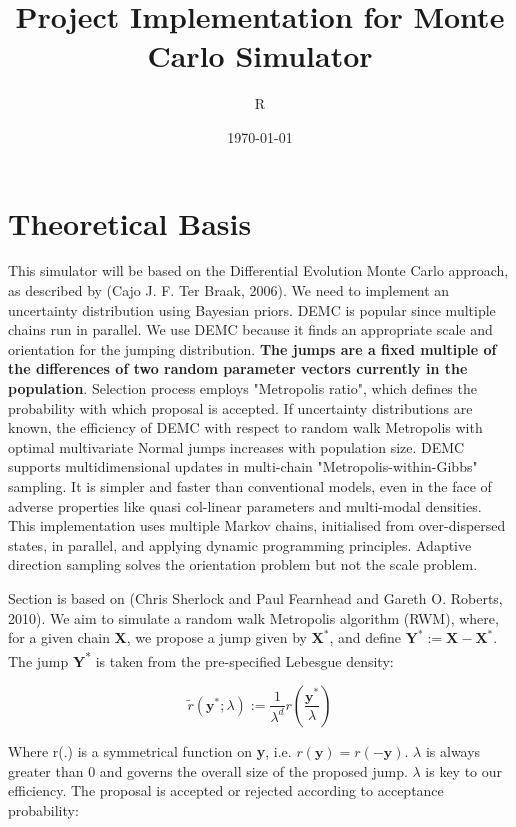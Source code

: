\documentclass[a4paper]{article}
\author{R}
\date{\today}
\title{Project Implementation for Monte Carlo Simulator}
\begin{document}
\maketitle
\tableofcontents

\tableofcontents
\flushleft
\section{Theoretical Basis}
\label{sec:orgd8a7171}

This simulator will be based on the Differential Evolution Monte Carlo approach, as described by (Cajo J. F. Ter Braak, 2006). We need to implement an uncertainty distribution using Bayesian priors. DEMC is popular since multiple chains run in parallel. We use DEMC because it finds an appropriate scale and orientation for the jumping distribution. \textbf{The jumps are a fixed multiple of the differences of two random parameter vectors currently in the population}. Selection process employs "Metropolis ratio", which defines the probability with which  proposal is accepted. If uncertainty distributions are known, the efficiency of DEMC with respect to random walk Metropolis with optimal multivariate Normal jumps increases with population size. DEMC supports multidimensional updates in multi-chain "Metropolis-within-Gibbs" sampling. It is simpler and faster than conventional models, even in the face of adverse properties like quasi col-linear parameters and multi-modal densities. This implementation uses multiple Markov chains, initialised from over-dispersed states, in parallel, and applying dynamic programming principles. Adaptive direction sampling solves the orientation problem but not the scale problem.

\hfill \newline

Section is based on (Chris Sherlock and Paul Fearnhead and Gareth O. Roberts, 2010). We aim to simulate a random walk Metropolis algorithm (RWM), where, for a given chain \textbf{X}, we propose a jump given by \(\mathbf{X}^*\), and define \(\mathbf{Y}^* := \mathbf{X} - \mathbf{X}^*\). The jump \textbf{Y}\textsuperscript{*} is taken from the pre-specified Lebesgue density:

\[\tilde{r} (\mathbf{y}^*; \lambda) := \frac{1}{\lambda^d} r \left(\frac{\mathbf{y}^*}{\lambda} \right) \]

Where r(.) is a symmetrical function on \textbf{y}, i.e. \(r(\mathbf{y}) = r(- \mathbf{y})\). \(\lambda\) is always greater than 0 and governs the overall size of the proposed jump. \(\lambda\) is key to our efficiency. The proposal is accepted or rejected according to acceptance probability:
\end{document}
